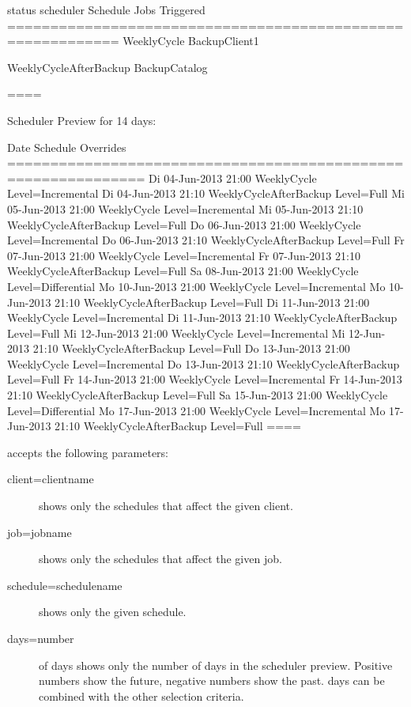\begin{description}
\begin{bconsole}{status scheduler}
Schedule               Jobs Triggered
===========================================================
WeeklyCycle
                       BackupClient1

WeeklyCycleAfterBackup
                       BackupCatalog

====

Scheduler Preview for 14 days:

Date                  Schedule                Overrides
==============================================================
Di 04-Jun-2013 21:00  WeeklyCycle             Level=Incremental
Di 04-Jun-2013 21:10  WeeklyCycleAfterBackup  Level=Full
Mi 05-Jun-2013 21:00  WeeklyCycle             Level=Incremental
Mi 05-Jun-2013 21:10  WeeklyCycleAfterBackup  Level=Full
Do 06-Jun-2013 21:00  WeeklyCycle             Level=Incremental
Do 06-Jun-2013 21:10  WeeklyCycleAfterBackup  Level=Full
Fr 07-Jun-2013 21:00  WeeklyCycle             Level=Incremental
Fr 07-Jun-2013 21:10  WeeklyCycleAfterBackup  Level=Full
Sa 08-Jun-2013 21:00  WeeklyCycle             Level=Differential
Mo 10-Jun-2013 21:00  WeeklyCycle             Level=Incremental
Mo 10-Jun-2013 21:10  WeeklyCycleAfterBackup  Level=Full
Di 11-Jun-2013 21:00  WeeklyCycle             Level=Incremental
Di 11-Jun-2013 21:10  WeeklyCycleAfterBackup  Level=Full
Mi 12-Jun-2013 21:00  WeeklyCycle             Level=Incremental
Mi 12-Jun-2013 21:10  WeeklyCycleAfterBackup  Level=Full
Do 13-Jun-2013 21:00  WeeklyCycle             Level=Incremental
Do 13-Jun-2013 21:10  WeeklyCycleAfterBackup  Level=Full
Fr 14-Jun-2013 21:00  WeeklyCycle             Level=Incremental
Fr 14-Jun-2013 21:10  WeeklyCycleAfterBackup  Level=Full
Sa 15-Jun-2013 21:00  WeeklyCycle             Level=Differential
Mo 17-Jun-2013 21:00  WeeklyCycle             Level=Incremental
Mo 17-Jun-2013 21:10  WeeklyCycleAfterBackup  Level=Full
====
\end{bconsole}

 accepts the following parameters:
\begin{description}
    \item[client=clientname] shows only the schedules that affect the given client.
    \item[job=jobname] shows only the schedules that affect the given job.
    \item[schedule=schedulename] shows only the given schedule.
    \item[days=number] of days shows only the number of days in the scheduler preview. Positive numbers show the future, negative numbers show the past. days can be combined with the other selection criteria.
\end{description}


\end{description}

